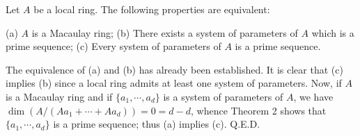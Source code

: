 Let $A$ be a local ring. The following properties are equivalent:

(a) $A$ is a Macaulay ring;
(b) There exists a system of parameters of $A$ which is a prime sequence;
(c) Every system of parameters of $A$ is a prime sequence.

The equivalence of (a) and (b) has already been established. It is clear that (c) implies (b) since a local ring admits at least one system of parameters. Now, if $A$ is a Macaulay ring and if $\{a_1, \cdots, a_d\}$ is a system of parameters of $A$, we have $\dim (A / (Aa_1 + \cdots + Aa_d)) = 0 = d - d$, whence Theorem 2 shows that $\{a_1, \cdots, a_d\}$ is a prime sequence; thus (a) implies (c). Q.E.D.